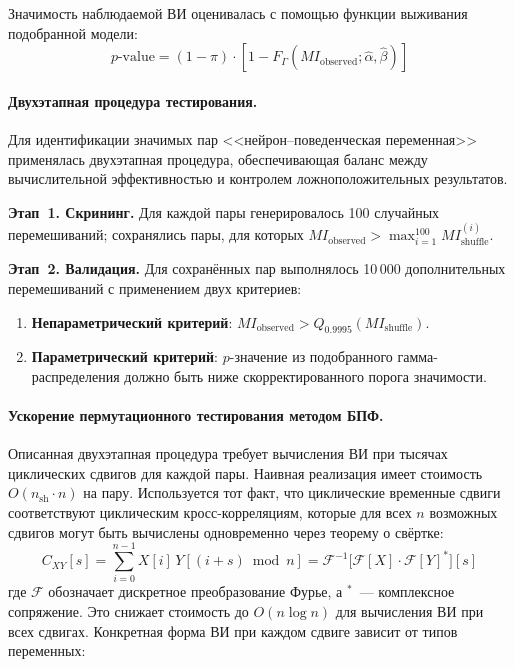 Значимость наблюдаемой ВИ оценивалась с помощью функции выживания подобранной модели:
$$p\text{-value} = (1 - \pi) \cdot [1 - F_\Gamma(MI_{\text{observed}}; \hat{\alpha}, \hat{\beta})]$$

\paragraph{Двухэтапная процедура тестирования.}

Для идентификации значимых пар <<нейрон--поведенческая переменная>> применялась двухэтапная процедура, обеспечивающая баланс между вычислительной эффективностью и контролем ложноположительных результатов.

\textbf{Этап~1. Скрининг.} Для каждой пары генерировалось 100 случайных перемешиваний; сохранялись пары, для которых $MI_{\text{observed}} > \max_{i=1}^{100} MI_{\text{shuffle}}^{(i)}$.

\textbf{Этап~2. Валидация.} Для сохранённых пар выполнялось 10\,000 дополнительных перемешиваний с применением двух критериев:
\begin{enumerate}
    \item \textbf{Непараметрический критерий}: $MI_{\text{observed}} > Q_{0.9995}(MI_{\text{shuffle}})$.
    \item \textbf{Параметрический критерий}: $p$-значение из подобранного гамма-распределения должно быть ниже скорректированного порога значимости.
\end{enumerate}

\paragraph{Ускорение пермутационного тестирования методом БПФ.}

Описанная двухэтапная процедура требует вычисления ВИ при тысячах циклических сдвигов для каждой пары. Наивная реализация имеет стоимость $O(n_{\text{sh}} \cdot n)$ на пару. Используется тот факт, что циклические временные сдвиги соответствуют циклическим кросс-корреляциям, которые для всех $n$ возможных сдвигов могут быть вычислены одновременно через теорему о свёртке:
\begin{equation}
\label{eq:fft_xcorr}
C_{XY}[s] = \sum_{i=0}^{n-1} X[i] \, Y[(i+s) \bmod n]
           = \mathcal{F}^{-1}\!\bigl[\mathcal{F}[X] \cdot \mathcal{F}[Y]^{*}\bigr][s]
\end{equation}
где $\mathcal{F}$ обозначает дискретное преобразование Фурье, а $^{*}$~--- комплексное сопряжение. Это снижает стоимость до $O(n \log n)$ для вычисления ВИ при всех сдвигах. Конкретная форма ВИ при каждом сдвиге зависит от типов переменных:

